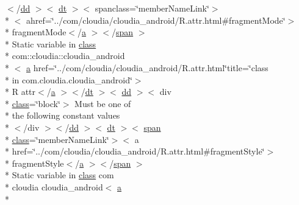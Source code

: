 \begin{DoxyCompactItemize}
\item 
$<$/\hyperlink{stylesheet_8css_a47f4718a86835a7771ec592ece845221}{dd} $>$$<$ \hyperlink{stylesheet_8css_a107565fb4039d33b041380d6e0ea1d80}{dt} $>$$<$ spanclass=\char`\"{}member\-Name\-Link\char`\"{}$>$\\*
$<$ ahref=\char`\"{}../com/cloudia/cloudia\-\_\-android/R.\-attr.\-html\#fragment\-Mode\char`\"{}$>$\\*
 fragment\-Mode$<$/\hyperlink{style_8css_a5e8981582017bb8b84c21f148345d1f7}{a} $>$$<$/\hyperlink{stylesheet_8css_a8343996ebcf16220b04e54659aac31cc}{span} $>$\\*
 Static variable in \hyperlink{_tools_8html_acf06f836132665ba8114f5a414c2403f}{class} \\*
com\-::cloudia\-::cloudia\-\_\-android\\*
$<$ \hyperlink{style_8css_a5e8981582017bb8b84c21f148345d1f7}{a} href=\char`\"{}../com/cloudia/cloudia\-\_\-android/R.\-attr.\-html\char`\"{}title=\char`\"{}class \\*
in com.\-cloudia.\-cloudia\-\_\-android\char`\"{}$>$\\*
 R attr$<$/\hyperlink{style_8css_a5e8981582017bb8b84c21f148345d1f7}{a} $>$$<$/\hyperlink{stylesheet_8css_a107565fb4039d33b041380d6e0ea1d80}{dt} $>$$<$ \hyperlink{stylesheet_8css_a47f4718a86835a7771ec592ece845221}{dd} $>$$<$ div \\*
\hyperlink{_tools_8html_acf06f836132665ba8114f5a414c2403f}{class}=\char`\"{}block\char`\"{}$>$ Must be one of \\*
the following constant values\\*
$<$/div $>$$<$/\hyperlink{stylesheet_8css_a47f4718a86835a7771ec592ece845221}{dd} $>$$<$ \hyperlink{stylesheet_8css_a107565fb4039d33b041380d6e0ea1d80}{dt} $>$$<$ \hyperlink{stylesheet_8css_a8343996ebcf16220b04e54659aac31cc}{span} \\*
\hyperlink{_tools_8html_acf06f836132665ba8114f5a414c2403f}{class}=\char`\"{}member\-Name\-Link\char`\"{}$>$$<$ a \\*
href=\char`\"{}../com/cloudia/cloudia\-\_\-android/R.\-attr.\-html\#fragment\-Style\char`\"{}$>$\\*
 fragment\-Style$<$/\hyperlink{style_8css_a5e8981582017bb8b84c21f148345d1f7}{a} $>$$<$/\hyperlink{stylesheet_8css_a8343996ebcf16220b04e54659aac31cc}{span} $>$\\*
 Static variable in \hyperlink{_tools_8html_acf06f836132665ba8114f5a414c2403f}{class} com \\*
cloudia cloudia\-\_\-android$<$ \hyperlink{style_8css_a5e8981582017bb8b84c21f148345d1f7}{a} \\*
$$
\end{DoxyCompactItemize}
